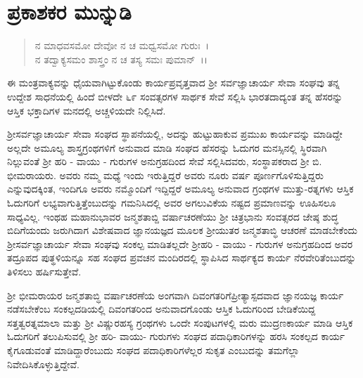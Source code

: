
\chapter*{ಪ್ರಕಾಶಕರ ಮುನ್ನುಡಿ}

\begin{verse}
ನ ಮಾಧವಸಮೋ ದೇವೋ ನ ಚ ಮಧ್ವಸಮೋ ಗುರುಃ~।\\ ನ ತದ್ವಾಕ್ಯಸಮಂ ಶಾಸ್ತ್ರಂ ನ ಚ ತಸ್ಯ ಸಮಃ ಪುಮಾನ್~।।
\end{verse}

ಈ ಮಂತ್ರವಾಕ್ಯವನ್ನು ಧೈಯವಾಗಿಟ್ಟುಕೊಂಡು ಕಾರ್ಯಪ್ರವೃತ್ತವಾದ ಶ‍್ರೀ ಸರ್ವಜ್ಞಾ\-ಚಾರ್ಯ ಸೇವಾ ಸಂಘವು ತನ್ನ ಉದ್ದೇಶ ಸಾಧನೆಯಲ್ಲಿ ಹಿಂದೆ ಬೀಳದೇ ೬೯ ಸಂವತ್ಸರಗಳ ಸಾರ್ಥಕ ಸೇವೆ ಸಲ್ಲಿಸಿ ಭಾರತದಾದ್ಯಂತ ತನ್ನ ಹೆಸರನ್ನು ಆಸ್ತಿಕ ಭಕ್ತಾದಿಗಳ ಮನದಲ್ಲಿ ಅಚ್ಚಳಿಯದೇ ನಿಲ್ಲಿಸಿದೆ.

ಶ‍್ರೀಸರ್ವಜ್ಞಾಚಾರ್ಯ ಸೇವಾ ಸಂಘದ ಸ್ಥಾಪನೆಯಲ್ಲಿ, ಅದನ್ನು ಹುಟ್ಟುಹಾಕುವ ಪ್ರಮುಖ ಕಾರ್ಯವನ್ನು ಮಾಡಿದ್ದೇ ಅಲ್ಲದೇ ಅಮೂಲ್ಯ ಶಾಸ್ತ್ರಗ್ರಂಥಗಳಿಗೆ ಅನುವಾದ ಮಾಡಿ ಸಂಘದ ಹೆಸರನ್ನು ಓದುಗರ ಮನಸ್ಸಿನಲ್ಲಿ ಸ್ಥಿರವಾಗಿ ನಿಲ್ಲುವಂತೆ ಶ‍್ರೀ ಹರಿ - ವಾಯು - ಗುರು\-ಗಳ ಅನುಗ್ರಹದಿಂದ ಸೇವೆ ಸಲ್ಲಿಸಿದವರು, ಸಂಸ್ಥಾಪಕರಾದ ಶ‍್ರೀ ಬಿ. ಭೀಮರಾಯರು. ಅವರು ನಮ್ಮ ಮಧ್ಯೆ ಇಂದು ಇರುತ್ತಿದ್ದರೆ ಅವರು ನೂರು ವರ್ಷ ಪೂರ್ಣಗೊಳಿಸುತ್ತಿದ್ದರು ಎನ್ನುವುದಕ್ಕಿಂತ, ಇಂದಿಗೂ ಅವರು ನಮ್ಮೊಂದಿಗೆ ಇದ್ದಿದ್ದರೆ ಅಮೂಲ್ಯ ಅನುವಾದ ಗ್ರಂಥಗಳ ಮುತ್ತು-ರತ್ನಗಳು ಆಸ್ತಿಕ ಓದುಗರಿಗೆ ಲಭ್ಯವಾಗುತ್ತಿತ್ತೆಂಬುದನ್ನು ಗಮನಿಸಿದಲ್ಲಿ ಅವರ ಅಗಲುವಿಕೆಯ ನಷ್ಟದ ಪ್ರಮಾಣವನ್ನು ಊಹಿಸಲೂ ಸಾಧ್ಯವಿಲ್ಲ. ಇಂಥಹ ಮಹಾನುಭಾವರ ಜನ್ಮಶತಾಬ್ದಿ ವರ್ಷಾಚರಣೆಯು ಶ‍್ರೀ ಚಿತ್ರಭಾನು ಸಂವತ್ಸರದ ಜೇಷ್ಠ ಶುದ್ಧ ಬಿದಿಗೆಯಂದು ಜರುಗಿದಾಗ ವಿಶೇಷವಾದ ಜ್ಞಾನಯಜ್ಞದ ಮೂಲಕ ಶ‍್ರೀಯುತರ ಜನ್ಮಶತಾಬ್ಧಿ ಆಚರಣೆ ಮಾಡಬೇಕೆಂದು ಶ‍್ರೀಸರ್ವಜ್ಞಾಚಾರ್ಯ ಸೇವಾ ಸಂಘವು ಸಂಕಲ್ಪ ಮಾಡಿತಲ್ಲದೇ ಶ‍್ರೀಹರಿ - ವಾಯು - ಗುರುಗಳ ಅನುಗ್ರಹದಿಂದ ಅವರ ತದ್ರೂಪದ ಪುತ್ಥಳಿಯನ್ನೂ ಸಹ ಸಂಘದ ಪ್ರವಚನ ಮಂದಿರದಲ್ಲಿ ಸ್ಥಾಪಿಸಿದ ಸಾರ್ಥಕ್ಯದ ಕಾರ್ಯ ನೆರವೇರಿತೆಂಬುದನ್ನು ತಿಳಿಸಲು ಹರ್ಷಿಸುತ್ತೇವೆ.

\newpage

ಶ‍್ರೀ ಭೀಮರಾಯರ ಜನ್ಮಶತಾಬ್ಧಿ ವರ್ಷಾಚರಣೆಯ ಅಂಗವಾಗಿ ದಿವಂಗತರಿಗೆ\break ಪ್ರೀತ್ಯಾಸ್ಪದವಾದ ಜ್ಞಾನಯಜ್ಞ ಕಾರ್ಯ ನಡೆಸಬೇಕೆಂಬ ಸಂಕಲ್ಪದಡಿಯಲ್ಲಿ ದಿವಂಗತರಿಂದ ಅನುವಾದಗೊಂಡು ಆಸ್ತಿಕ ಓದುಗರಿಂದ ಬೇಡಿಕೆಯಿದ್ದ ಸತ್ತತ್ವರತ್ನಮಾಲಾ ಮತ್ತು ಶ‍್ರೀ ವಿಷ್ಣುರಹಸ್ಯ ಗ್ರಂಥಗಳು ಒಂದೇ ಸಂಪುಟಗಳಲ್ಲಿ ಮರು ಮುದ್ರಣಕಾರ್ಯ ಮಾಡಿ ಆಸ್ತಿಕ ಓದುಗರಿಗೆ ತಲುಪಿಸುವಲ್ಲಿ ಶ‍್ರೀ ಹರಿ- ವಾಯು- ಗುರುಗಳು ಸಂಘದ ಪದಾಧಿಕಾರಿಗಳನ್ನು ಹರಸಿ ಸಂಕಲ್ಪದ ಕಾರ್ಯ ಕೈಗೂಡುವಂತೆ ಮಾಡಿದ್ದಾರೆಂಬುದು ಸಂಘದ ಪದಾಧಿಕಾರಿಗಳೆಲ್ಲರ ಸುಕೃತ ಎಂಬುದನ್ನು ತಮಗೆಲ್ಲಾ ನಿವೇದಿಸಿಕೊಳ್ಳುತ್ತಿದ್ದೇವೆ.

